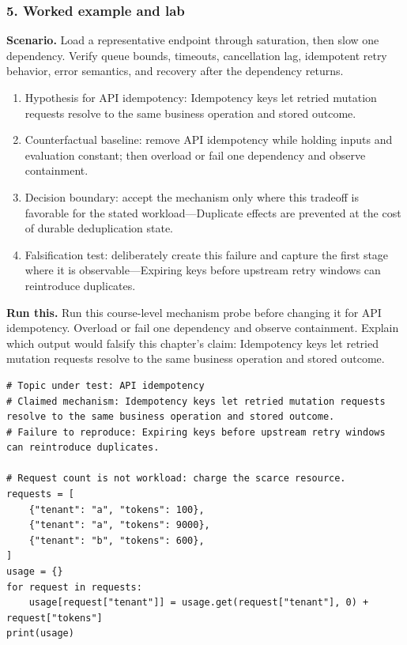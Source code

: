 \subsubsection*{5. Worked example and lab}
\textbf{Scenario.} Load a representative endpoint through saturation, then slow one dependency. Verify queue bounds, timeouts, cancellation lag, idempotent retry behavior, error semantics, and recovery after the dependency returns.
\begin{enumerate}
\item Hypothesis for API idempotency: Idempotency keys let retried mutation requests resolve to the same business operation and stored outcome.
\item Counterfactual baseline: remove API idempotency while holding inputs and evaluation constant; then overload or fail one dependency and observe containment.
\item Decision boundary: accept the mechanism only where this tradeoff is favorable for the stated workload—Duplicate effects are prevented at the cost of durable deduplication state.
\item Falsification test: deliberately create this failure and capture the first stage where it is observable—Expiring keys before upstream retry windows can reintroduce duplicates.
\end{enumerate}
\textbf{Run this.} Run this course-level mechanism probe before changing it for API idempotency. Overload or fail one dependency and observe containment. Explain which output would falsify this chapter's claim: Idempotency keys let retried mutation requests resolve to the same business operation and stored outcome.
\begin{Verbatim}[fontsize=\scriptsize]
# Topic under test: API idempotency
# Claimed mechanism: Idempotency keys let retried mutation requests resolve to the same business operation and stored outcome.
# Failure to reproduce: Expiring keys before upstream retry windows can reintroduce duplicates.

# Request count is not workload: charge the scarce resource.
requests = [
    {"tenant": "a", "tokens": 100},
    {"tenant": "a", "tokens": 9000},
    {"tenant": "b", "tokens": 600},
]
usage = {}
for request in requests:
    usage[request["tenant"]] = usage.get(request["tenant"], 0) + request["tokens"]
print(usage)
\end{Verbatim}
